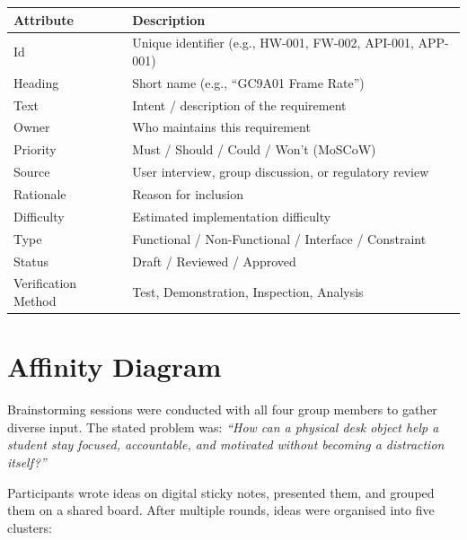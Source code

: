 \documentclass[12pt,a4paper]{article}
\begin{document}
\begin{center}
\begin{tabular}{|L{0.25\textwidth}|L{0.63\textwidth}|}
\hline
\textbf{Attribute} & \textbf{Description} \\ \hline
Id & Unique identifier (e.g., HW-001, FW-002, API-001, APP-001) \\ \hline
Heading & Short name (e.g., ``GC9A01 Frame Rate'') \\ \hline
Text & Intent / description of the requirement \\ \hline
Owner & Who maintains this requirement \\ \hline
Priority & Must / Should / Could / Won't (MoSCoW) \\ \hline
Source & User interview, group discussion, or regulatory review \\ \hline
Rationale & Reason for inclusion \\ \hline
Difficulty & Estimated implementation difficulty \\ \hline
Type & Functional / Non-Functional / Interface / Constraint \\ \hline
Status & Draft / Reviewed / Approved \\ \hline
Verification Method & Test, Demonstration, Inspection, Analysis \\ \hline
\end{tabular}
\end{center}

\section*{Affinity Diagram}

Brainstorming sessions were conducted with all four group members to gather diverse
input. The stated problem was: \textit{``How can a physical desk object help a student
stay focused, accountable, and motivated without becoming a distraction itself?''}

Participants wrote ideas on digital sticky notes, presented them, and grouped them on
a shared board. After multiple rounds, ideas were organised into five clusters:
\end{document}
